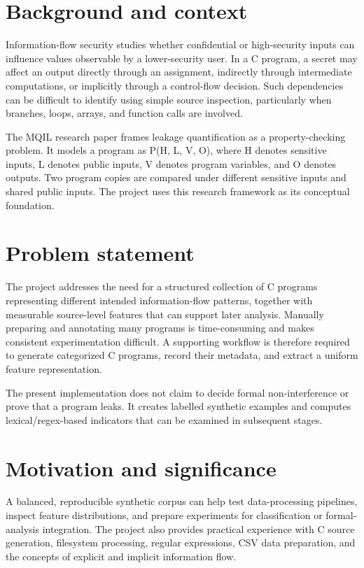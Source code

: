 \documentclass[12pt,a4paper,oneside]{report}
\begin{document}
\section{Background and context}
Information-flow security studies whether confidential or high-security inputs can influence values observable by a lower-security user. In a C program, a secret may affect an output directly through an assignment, indirectly through intermediate computations, or implicitly through a control-flow decision. Such dependencies can be difficult to identify using simple source inspection, particularly when branches, loops, arrays, and function calls are involved.\par
The MQIL research paper frames leakage quantification as a property-checking problem. It models a program as P(H, L, V, O), where H denotes sensitive inputs, L denotes public inputs, V denotes program variables, and O denotes outputs. Two program copies are compared under different sensitive inputs and shared public inputs. The project uses this research framework as its conceptual foundation.\par

\section{Problem statement}
The project addresses the need for a structured collection of C programs representing different intended information-flow patterns, together with measurable source-level features that can support later analysis. Manually preparing and annotating many programs is time-consuming and makes consistent experimentation difficult. A supporting workflow is therefore required to generate categorized C programs, record their metadata, and extract a uniform feature representation.\par
The present implementation does not claim to decide formal non-interference or prove that a program leaks. It creates labelled synthetic examples and computes lexical/regex-based indicators that can be examined in subsequent stages.\par

\section{Motivation and significance}
A balanced, reproducible synthetic corpus can help test data-processing pipelines, inspect feature distributions, and prepare experiments for classification or formal-analysis integration. The project also provides practical experience with C source generation, filesystem processing, regular expressions, CSV data preparation, and the concepts of explicit and implicit information flow.\par
\end{document}
